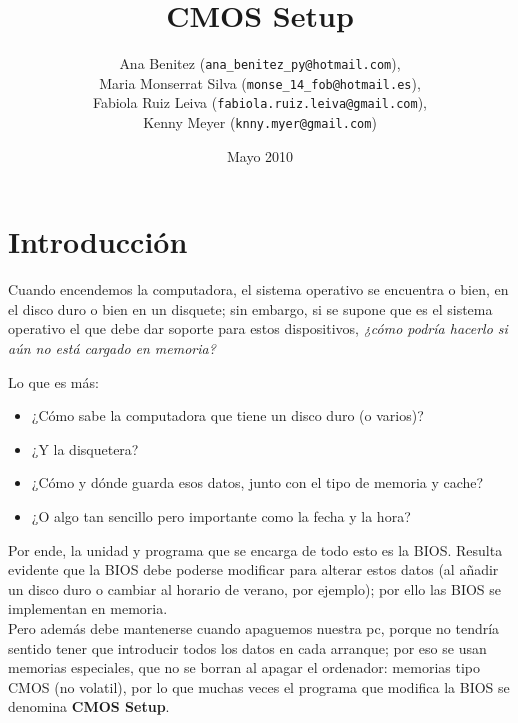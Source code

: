 \documentclass[12pt,oneside,a4paper]{article}
\begin{document}
\title{CMOS Setup}
\author{Ana Benitez (\texttt{ana\_benitez\_py@hotmail.com}), \\
		Maria Monserrat Silva (\texttt{monse\_14\_fob@hotmail.es}), \\
		Fabiola Ruiz Leiva (\texttt{fabiola.ruiz.leiva@gmail.com}), \\ 
		Kenny Meyer (\texttt{knny.myer@gmail.com})}
\date{Mayo 2010}
\maketitle
\clearpage

%
\setcounter{tocdepth}{3}
\tableofcontents
\newpage

\section{Introducción}{\label{sec:introduccion}}

Cuando encendemos la computadora, el sistema operativo se encuentra o bien, en
el disco duro o bien en un disquete; sin embargo, si se supone que es el
sistema operativo el que debe dar soporte para estos dispositivos, {\em ¿cómo podría
hacerlo si aún no está cargado en memoria?}

Lo que es más:
\begin{itemize}
	\item ¿Cómo sabe la computadora que tiene un disco duro (o varios)?
	\item ¿Y la disquetera?  
	\item ¿Cómo y dónde guarda esos datos, junto con el tipo de memoria y cache?
	\item ¿O algo tan sencillo pero importante como la fecha y la hora? 
\end{itemize}

Por ende, la unidad y programa que se encarga de todo esto es la BIOS.
Resulta evidente que la BIOS debe poderse modificar para alterar estos datos
(al añadir un disco duro o cambiar al horario de verano, por ejemplo); por ello
las BIOS se implementan en memoria. \\
Pero además debe mantenerse cuando apaguemos nuestra pc, porque no tendría
sentido tener que introducir todos los datos en cada arranque; por eso se usan
memorias especiales, que no se borran al apagar el ordenador: memorias tipo
CMOS (no volatil), por lo que muchas veces el programa que modifica la BIOS se
denomina {\bf CMOS Setup}.
\end{document}
